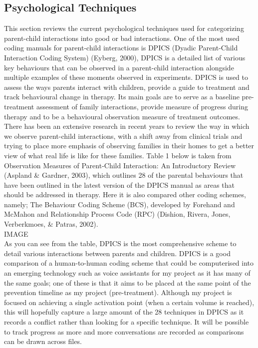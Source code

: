 \documentclass[a4paper,11pt]{report}
\begin{document}
\subsection{Psychological Techniques}
This section reviews the current psychological techniques used for categorizing parent-child interactions into good or bad interactions. One of the most used coding manuals for parent-child interactions is DPICS (Dyadic Parent-Child Interaction Coding System) (Eyberg, 2000), DPICS is a detailed list of various key behaviours that can be observed in a parent-child interaction alongside multiple examples of these moments observed in experiments. DPICS is used to assess the ways parents interact with children, provide a guide to treatment and track behavioural change in therapy. Its main goals are to serve as a baseline pre-treatment assessment of family interactions, provide measure of progress during therapy and to be a behavioural observation measure of treatment outcomes. There has been an extensive research in recent years to review the way in which we observe parent-child interactions, with a shift away from clinical trials and trying to place more emphasis of observing families in their homes to get a better view of what real life is like for these families. Table 1 below is taken from Observation Measures of Parent-Child Interaction: An Introductory Review (Aspland \& Gardner, 2003), which outlines 28 of the parental behaviours that have been outlined in the latest version of the DPICS manual as areas that should be addressed in therapy. Here it is also compared other coding schemes, namely; The Behaviour Coding Scheme (BCS), developed by Forehand and McMahon and Relationship Process Code (RPC) (Dishion, Rivera, Jones, Verberkmoes, \& Patras, 2002).\\

		IMAGE\\

As you can see from the table, DPICS is the most comprehensive scheme to detail various interactions between parents and children. DPICS is a good comparison of a human-to-human coding scheme that could be computerised into an emerging technology such as voice assistants for my project as it has many of the same goals; one of these is that it aims to be placed at the same point of the prevention timeline as my project (pre-treatment). Although my project is focused on achieving a single activation point (when a certain volume is reached), this will hopefully capture a large amount of the 28 techniques in DPICS as it records a conflict rather than looking for a specific technique. It will be possible to track progress as more and more conversations are recorded as comparisons can be drawn across files.   \\	
\end{document}
